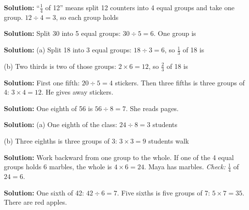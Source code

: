 \documentclass[12pt]{article}
\begin{document}



\textbf{Solution:} ``$\tfrac{1}{4}$ of 12'' means split 12 counters into 4
equal groups and take one group. $12 \div 4 = 3$, so each group holds


\textbf{Solution:} Split 30 into 5 equal groups: $30 \div 5 = 6$.
One group is 


\textbf{Solution:} (a) Split 18 into 3 equal groups: $18 \div 3 = 6$, so
$\tfrac{1}{3}$ of 18 is 

(b) Two thirds is two of those groups: $2 \times 6 = 12$, so $\tfrac{2}{3}$
of 18 is 


\textbf{Solution:} First one fifth: $20 \div 5 = 4$ stickers. Then three
fifths is three groups of 4: $3 \times 4 = 12$. He gives away 
stickers.


\textbf{Solution:} One eighth of 56 is $56 \div 8 = 7$. She reads 
pages.


\textbf{Solution:} (a) One eighth of the class: $24 \div 8 = 3$ students

(b) Three eighths is three groups of 3: $3 \times 3 = 9$ students walk


\textbf{Solution:} Work backward from one group to the whole. If one of the
4 equal groups holds 6 marbles, the whole is $4 \times 6 = 24$. Maya has
 marbles. \emph{Check:} $\tfrac{1}{4}$ of $24 = 6$. \checkmark


\textbf{Solution:} One sixth of 42: $42 \div 6 = 7$. Five sixths is five
groups of 7: $5 \times 7 = 35$. There are  red apples.
\end{document}
